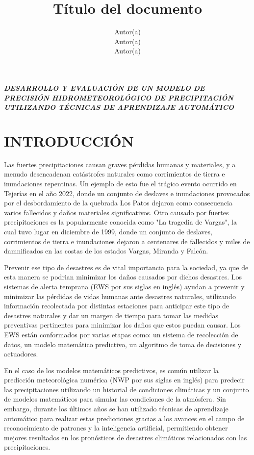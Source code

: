 \documentclass[stu, 12pt, helv, letterpaper, donotrepeattitle, floatsintext, natbib]{apa7}
\title{\Large Título del documento}
\author{Autor(a) \\Autor(a) \\Autor(a)} %
\affiliation{Nombre de la institución}
\begin{document}


\pagestyle{empty}

\begin{center}
{\large
\textbf{\textit{DESARROLLO Y EVALUACIÓN DE UN MODELO DE PRECISIÓN HIDROMETEOROLÓGICO DE PRECIPITACIÓN UTILIZANDO TÉCNICAS DE APRENDIZAJE AUTOMÁTICO\\}}}
\end{center}

\justify

\section*{INTRODUCCIÓN}

Las fuertes precipitaciones causan graves pérdidas humanas y materiales, y a menudo desencadenan catástrofes naturales como corrimientos de tierra e inundaciones repentinas. Un ejemplo de esto fue el trágico evento ocurrido en Tejerías en el año 2022, donde un conjunto de deslaves e inundaciones provocados por el desbordamiento de la quebrada Los Patos dejaron como consecuencia varios fallecidos y daños materiales significativos. Otro causado por fuertes precipitaciones es la popularmente conocida como "La tragedia de Vargas", la cual tuvo lugar en diciembre de 1999, donde un conjunto de deslaves, corrimientos de tierra e inundaciones dejaron a centenares de fallecidos y miles de damnificados en las costas de los estados Vargas, Miranda y Falcón.

Prevenir ese tipo de desastres es de vital importancia para la sociedad, ya que de esta manera se podrian minimizar los daños causados por dichos desastres. Los sistemas de alerta temprana (EWS por sus siglas en inglés) ayudan a prevenir y minimizar las pérdidas de vidas humanas ante desastres naturales, utilizando información recolectada por distintas estaciones para anticipar este tipo de desastres naturales y dar un margen de tiempo para tomar las medidas preventivas pertinentes para minimizar los daños que estos puedan causar. Los EWS están conformados por varias etapas como: un sistema de recolección de datos, un modelo matemático predictivo, un algoritmo de toma de decisiones y actuadores. 

En el caso de los modelos matemáticos predictivos, es común utilizar la predicción meteorológica numérica (NWP por sus siglas en inglés) para predecir las precipitaciones utilizando un historial de condiciones climáticas y un conjunto de modelos matemáticos para simular las condiciones de la atmósfera. Sin embargo, durante los últimos años se han utilizado técnicas de aprendizaje automático para realizar estas predicciones gracias a los avances en el campo de reconocimiento de patrones y la inteligencia artificial, permitiendo obtener mejores resultados en los pronósticos de desastres climáticos relacionados con las precipitaciones.
\end{document}
